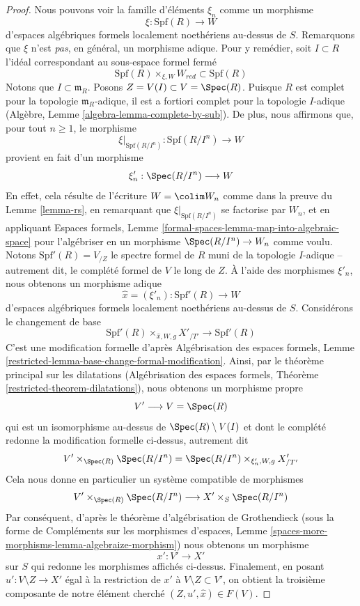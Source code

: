 \begin{proof}
\medskip\noindent
Nous pouvons voir la famille d'éléments $\xi_n$ comme un morphisme
$$
\xi : \text{Spf}(R) \longrightarrow W
$$
d'espaces algébriques formels localement noethériens au-dessus de $S$. Remarquons que $\xi$
n'est {\it pas}, en général, un morphisme adique. Pour y remédier, soit $I \subset R$
l'idéal correspondant au sous-espace formel fermé
$$
\text{Spf}(R) \times_{\xi, W} W_{red} \subset \text{Spf}(R)
$$
Notons que $I \subset \mathfrak m_R$. Posons $Z = V(I) \subset V = \Spec(R)$.
Puisque $R$ est complet pour la topologie $\mathfrak m_R$-adique, il est a fortiori
complet pour la topologie $I$-adique (Algèbre, Lemme \ref{algebra-lemma-complete-by-sub}).
De plus, nous affirmons que, pour tout $n \geq 1$, le morphisme
$$
\xi|_{\text{Spf}(R/I^n)} :
\text{Spf}(R/I^n)
\longrightarrow
W
$$
provient en fait d'un morphisme
$$
\xi'_n :  \Spec(R/I^n) \longrightarrow W
$$
En effet, cela résulte de l'écriture $W = \colim W_n$ comme dans la
preuve du Lemme \ref{lemma-rs}, en remarquant que $\xi|_{\text{Spf}(R/I^n)}$
se factorise par $W_n$, et en appliquant Espaces formels, Lemme
\ref{formal-spaces-lemma-map-into-algebraic-space}
pour l'algébriser en un morphisme $\Spec(R/I^n) \to W_n$
comme voulu. Notons $\text{Spf}'(R) = V_{/Z}$ le spectre formel
de $R$ muni de la topologie $I$-adique -- autrement dit, le complété formel
de $V$ le long de $Z$. À l'aide des morphismes
$\xi'_n$, nous obtenons un morphisme adique
$$
\hat x = (\xi'_n) : \text{Spf}'(R) \longrightarrow W
$$
d'espaces algébriques formels localement noethériens au-dessus de $S$.
Considérons le changement de base
$$
\text{Spf}'(R) \times_{\hat x, W, g} X'_{/T'} \longrightarrow \text{Spf}'(R)
$$
C'est une modification formelle d'après
Algébrisation des espaces formels, Lemme
\ref{restricted-lemma-base-change-formal-modification}.
Ainsi, par le théorème principal sur les dilatations
(Algébrisation des espaces formels, Théorème \ref{restricted-theorem-dilatations}),
nous obtenons un morphisme propre
$$
V' \longrightarrow V = \Spec(R)
$$
qui est un isomorphisme au-dessus de $\Spec(R) \setminus V(I)$ et
dont le complété redonne la modification formelle ci-dessus, autrement dit
$$
V' \times_{\Spec(R)} \Spec(R/I^n) =
\Spec(R/I^n) \times_{\xi'_n, W, g} X'_{/T'}
$$
Cela nous donne en particulier un système compatible de morphismes
$$
V' \times_{\Spec(R)} \Spec(R/I^n) \longrightarrow X' \times_S \Spec(R/I^n)
$$
Par conséquent, d'après le théorème d'algébrisation de Grothendieck (sous la forme de
Compléments sur les morphismes d'espaces, Lemme
\ref{spaces-more-morphisms-lemma-algebraize-morphism})
nous obtenons un morphisme
$$
x' : V' \to X'
$$
sur $S$ qui redonne les morphismes affichés ci-dessus. Finalement, en
posant $u' : V \setminus Z \to X'$ égal à la restriction de $x'$ à
$V \setminus Z \subset V'$, on obtient la troisième composante de notre
élément cherché $(Z, u', \hat x) \in F(V)$.
\end{proof}


